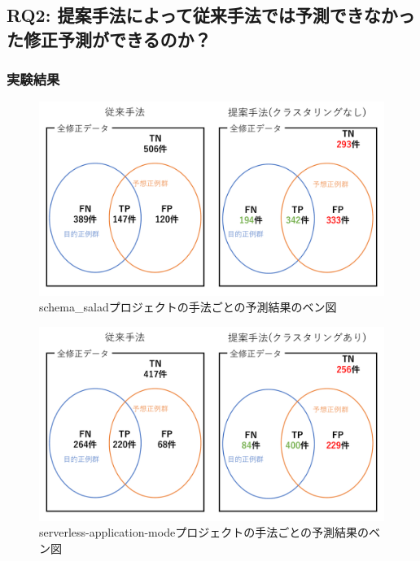 \documentclass[submit,noauthor,dvipdfmx]{ipsj}
\begin{document}
\subsection{RQ2: 提案手法によって従来手法では予測できなかった修正予測ができるのか？}\label{RQ2}

\subsubsection{実験結果}


\begin{figure}[bp]
	\centering
	\includegraphics[width=1\linewidth]{Kameoka_fig/benzu-schema-salad.pdf}
	\caption{schema\_saladプロジェクトの手法ごとの予測結果のベン図}
	\label{fig:schema_salad}
\end{figure}


\begin{figure}[bp]
	\centering
	\includegraphics[width=1\linewidth]{Kameoka_fig/benzu-serverless-application-mode.pdf}
	\caption{serverless-application-modeプロジェクトの手法ごとの予測結果のベン図}
	\label{fig:serverless-application-mode}
\end{figure}
\end{document}

